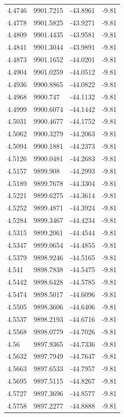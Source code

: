\begin{table}[H]
\begin{tabular}{llll}
4.4746 & 9901.7215 & -43.8961 & -9.81 \\
4.4778 & 9901.5825 & -43.9271 & -9.81 \\
4.4809 & 9901.4435 & -43.9581 & -9.81 \\
4.4841 & 9901.3044 & -43.9891 & -9.81 \\
4.4873 & 9901.1652 & -44.0201 & -9.81 \\
4.4904 & 9901.0259 & -44.0512 & -9.81 \\
4.4936 & 9900.8865 & -44.0822 & -9.81 \\
4.4968 & 9900.747 & -44.1132 & -9.81 \\
4.4999 & 9900.6074 & -44.1442 & -9.81 \\
4.5031 & 9900.4677 & -44.1752 & -9.81 \\
4.5062 & 9900.3279 & -44.2063 & -9.81 \\
4.5094 & 9900.1881 & -44.2373 & -9.81 \\
4.5126 & 9900.0481 & -44.2683 & -9.81 \\
4.5157 & 9899.908 & -44.2993 & -9.81 \\
4.5189 & 9899.7678 & -44.3304 & -9.81 \\
4.5221 & 9899.6275 & -44.3614 & -9.81 \\
4.5252 & 9899.4871 & -44.3924 & -9.81 \\
4.5284 & 9899.3467 & -44.4234 & -9.81 \\
4.5315 & 9899.2061 & -44.4544 & -9.81 \\
4.5347 & 9899.0654 & -44.4855 & -9.81 \\
4.5379 & 9898.9246 & -44.5165 & -9.81 \\
4.541 & 9898.7838 & -44.5475 & -9.81 \\
4.5442 & 9898.6428 & -44.5785 & -9.81 \\
4.5474 & 9898.5017 & -44.6096 & -9.81 \\
4.5505 & 9898.3606 & -44.6406 & -9.81 \\
4.5537 & 9898.2193 & -44.6716 & -9.81 \\
4.5568 & 9898.0779 & -44.7026 & -9.81 \\
4.56 & 9897.9365 & -44.7336 & -9.81 \\
4.5632 & 9897.7949 & -44.7647 & -9.81 \\
4.5663 & 9897.6533 & -44.7957 & -9.81 \\
4.5695 & 9897.5115 & -44.8267 & -9.81 \\
4.5727 & 9897.3696 & -44.8577 & -9.81 \\
4.5758 & 9897.2277 & -44.8888 & -9.81 \\

\end{tabular}
\end{table}
